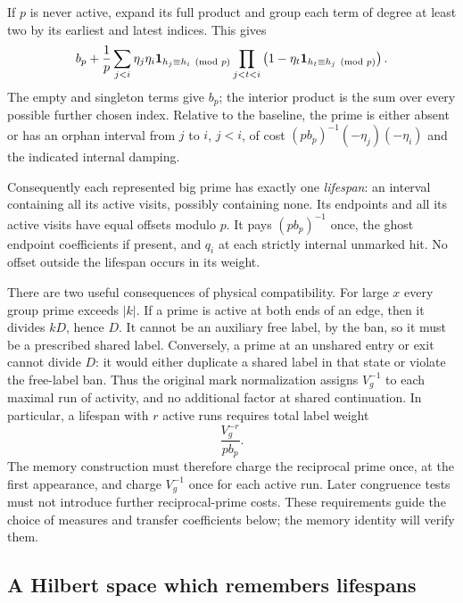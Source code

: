 If $p$ is never active, expand its full product and group each
term of degree at least two by its earliest and latest indices.
This gives
\begin{equation}\label{eq:orphan-expansion}
 b_p+\frac1p\sum_{j<i}\eta_j\eta_i
 \mathbf 1_{h_j\equiv h_i\pmod p}
 \prod_{j<t<i}\left(1-\eta_t
                         \mathbf 1_{h_t\equiv h_j\pmod p}\right).
\end{equation}
The empty and singleton terms give $b_p$; the interior product
is the sum over every possible further chosen index.  Relative
to the baseline, the prime is either absent or has an orphan
interval from $j$ to $i$, $j<i$, of cost
$(pb_p)^{-1}(-\eta_j)(-\eta_i)$ and the indicated internal
damping.

Consequently each represented big prime has exactly one
\emph{lifespan}: an interval containing all its active visits,
possibly containing none.  Its endpoints and all its active
visits have equal offsets modulo $p$.  It pays $(pb_p)^{-1}$
once, the ghost endpoint coefficients if present, and $q_i$
at each strictly internal unmarked hit.  No offset outside
the lifespan occurs in its weight.

There are two useful consequences of physical compatibility.
For large $x$ every group prime exceeds $|k|$.  If a prime is
active at both ends of an edge, then it divides $kD$, hence
$D$.  It cannot be an auxiliary free label, by the ban, so
it must be a prescribed shared label.  Conversely, a prime at
an unshared entry or exit cannot divide $D$: it would either
duplicate a shared label in that state or violate the free-label
ban.  Thus the original mark normalization assigns $V_g^{-1}$
to each maximal run of activity, and no additional factor at
shared continuation.  In particular, a lifespan with $r$ active runs
requires total label weight
\[
 \frac{V_g^{-r}}{pb_p}.
\]
The memory construction must therefore charge the reciprocal prime once,
at the first appearance, and charge $V_g^{-1}$ once for each active run.
Later congruence tests must not introduce further reciprocal-prime costs.
These requirements guide the choice of measures and transfer coefficients
below; the memory identity will verify them.

\subsection{A Hilbert space which remembers lifespans}


